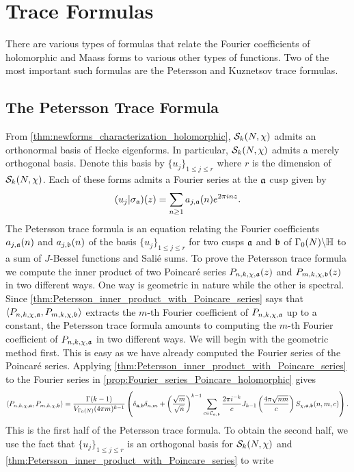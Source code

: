 \chapter{Trace Formulas}
  There are various types of formulas that relate the Fourier coefficients of holomorphic and Maass forms to various other types of functions. Two of the most important such formulas are the Petersson and Kuznetsov trace formulas.
  \section{The Petersson Trace Formula}
    From \cref{thm:newforms_characterization_holomorphic}, $\mathcal{S}_{k}(N,\chi)$ admits an orthonormal basis of Hecke eigenforms. In particular, $\mathcal{S}_{k}(N,\chi)$ admits a merely orthogonal basis. Denote this basis by $\{u_{j}\}_{1 \le j \le r}$ where $r$ is the dimension of $\mathcal{S}_{k}(N,\chi)$. Each of these forms admits a Fourier series at the $\mathfrak{a}$ cusp given by
    \[
      (u_{j}|\sigma_{\mathfrak{a}})(z) = \sum_{n \ge 1}a_{j,\mathfrak{a}}(n)e^{2\pi inz}.
    \]
    The Petersson trace formula is an equation relating the Fourier coefficients $a_{j,\mathfrak{a}}(n)$ and $a_{j,\mathfrak{b}}(n)$ of the basis $\{u_{j}\}_{1 \le j \le r}$ for two cusps $\mathfrak{a}$ and $\mathfrak{b}$ of $\Gamma_{0}(N)\backslash\mathbb{H}$ to a sum of $J$-Bessel functions and Sali\'e sums. To prove the Petersson trace formula we compute the inner product of two Poincar\'e series $P_{n,k,\chi,\mathfrak{a}}(z)$ and $P_{m,k,\chi,\mathfrak{b}}(z)$ in two different ways. One way is geometric in nature while the other is spectral. Since \cref{thm:Petersson_inner_product_with_Poincare_series} says that $\langle P_{n,k,\chi,\mathfrak{a}},P_{m,k,\chi,\mathfrak{b}}\rangle$ extracts the $m$-th Fourier coefficient of $P_{n,k,\chi,\mathfrak{a}}$ up to a constant, the Petersson trace formula amounts to computing the $m$-th Fourier coefficient of $P_{n,k,\chi,\mathfrak{a}}$ in two different ways. We will begin with the geometric method first. This is easy as we have already computed the Fourier series of the Poincar\'e series. Applying \cref{thm:Petersson_inner_product_with_Poincare_series} to the Fourier series in \cref{prop:Fourier_series_Poincare_holomorphic} gives
    \[
      \langle P_{n,k,\chi,\mathfrak{a}},P_{m,k,\chi,\mathfrak{b}}\rangle = \frac{\Gamma(k-1)}{V_{\Gamma_{0}(N)}(4\pi m)^{k-1}}\left(\delta_{\mathfrak{a},\mathfrak{b}}\delta_{n,m}+\left(\frac{\sqrt{m}}{\sqrt{n}}\right)^{k-1}\sum_{c \in \mathcal{C}_{\mathfrak{a},\mathfrak{b}}}\frac{2\pi i^{-k}}{c}J_{k-1}\left(\frac{4\pi\sqrt{nm}}{c}\right)S_{\chi,\mathfrak{a},\mathfrak{b}}(n,m,c)\right).
    \]
    This is the first half of the Petersson trace formula. To obtain the second half, we use the fact that $\{u_{j}\}_{1 \le j \le r}$ is an orthogonal basis for $\mathcal{S}_{k}(N,\chi)$ and \cref{thm:Petersson_inner_product_with_Poincare_series} to write
